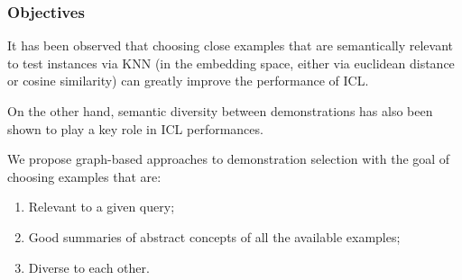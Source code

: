 \documentclass{beamer}
\theoremstyle{definition}
\theoremstyle{plain}
\theoremstyle{Remark}
\begin{document}
	
	\begin{frame}
		\frametitle{Objectives}
		
		\pause
		It has been observed that choosing close examples that are semantically relevant
		to test instances via KNN (in the embedding space, either via euclidean distance or cosine similarity) can greatly improve the performance of ICL.\pause \bigskip
		
		On the other hand, semantic diversity between demonstrations has also been shown to play a key role in ICL performances.
		
		We propose graph-based approaches to demonstration selection with the goal of choosing examples that are:\pause
		\begin{enumerate}
			\item Relevant to a given query;\pause
			\item Good summaries of abstract concepts of all the available examples;\pause
			\item Diverse to each other.
		\end{enumerate}
		
		
	\end{frame}
\end{document}
